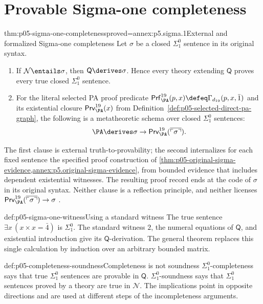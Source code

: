 \section{Provable Sigma-one completeness}

\begin{hbtheorem}{thm:p05-sigma-one-completeness}{proved=annex:p5.sigma.1}{External and formalized Sigma-one completeness}
Let \(\sigma\) be a closed \(\Sigma^0_1\) sentence in its original syntax.
\begin{enumerate}
  \item If \(\mathcal N\entails\sigma\), then
        \(\mathsf Q\derives\sigma\).  Hence every theory extending
        \(\mathsf Q\) proves every true closed \(\Sigma^0_1\) sentence.
  \item For the literal selected PA proof predicate
        \(\mathsf{Prf}^{19}_{\PA}(p,x)\defeq
          \Gamma_{d_{19}}(p,x,\bar1)\) and its existential closure
        \(\mathsf{Prv}^{19}_{\PA}(x)\) from
        Definition~\ref{def:p05-selected-direct-pa-graph}, the following is a
        metatheoretic schema over closed \(\Sigma^0_1\) sentences:
        \[
          \PA\derives
          \sigma\to
          \mathsf{Prv}^{19}_{\PA}(\overline{\ulcorner\sigma\urcorner}).
        \]
\end{enumerate}
The first clause is external truth-to-provability; the second internalizes
for each fixed sentence the specified proof construction of
\cref{thm:p05-original-sigma-evidence,annex:p5.original-sigma-evidence},
from bounded evidence that includes dependent existential witnesses.
The resulting proof record ends at the code of \(\sigma\) in its
original syntax. Neither clause is a reflection
principle, and neither licenses
\(\mathsf{Prv}^{19}_{\PA}(\overline{\ulcorner\sigma\urcorner})\to\sigma\)
\cite{Shoenfield1967,HilbertBernays1939}.
\end{hbtheorem}

\begin{hbexample}{def:p05-sigma-one-witness}{Using a standard witness}
The true sentence \(\exists x\,(x\times x=\bar4)\) is
\(\Sigma^0_1\).  The standard witness \(2\), the numeral equations of
\(\mathsf Q\), and existential introduction give its
\(\mathsf Q\)-derivation.  The general theorem replaces this single
calculation by induction over an arbitrary bounded matrix.
\end{hbexample}

\begin{hbwarning}{def:p05-completeness-soundness}{Completeness is not soundness}
\(\Sigma^0_1\)-completeness says that true \(\Sigma^0_1\) sentences are
provable in \(\mathsf Q\).  \(\Sigma^0_1\)-soundness says that
\(\Sigma^0_1\) sentences proved by a theory are true in
\(\mathcal N\).  The implications point in opposite
directions and are used at different steps of the incompleteness arguments.
\end{hbwarning}

